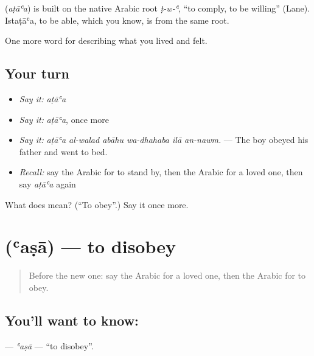 \begin{cousinweb}
\textbf{} (\emph{aṭāʿa}) is built on the native Arabic root \emph{ṭ-w-ʿ}, \textquotedblleft{}to comply, to be willing\textquotedblright{} (Lane). Istaṭāʿa, to be able, which you know, is from the same root.
\end{cousinweb}

\begin{grammarlens}[title={What you've built}]
One more word for describing what you lived and felt.
\end{grammarlens}

\subsection*{Your turn}
\begin{itemize}
\raggedright
  \item \emph{Say it:} \emph{aṭāʿa}
  \item \emph{Say it:} \emph{aṭāʿa}, once more
  \item \emph{Say it:} \emph{aṭāʿa al-walad abāhu wa-dhahaba ilā an-nawm.} — The boy obeyed his father and went to bed.
  \item \emph{Recall:} say the Arabic for to stand by, then the Arabic for a loved one, then say \emph{aṭāʿa} again
\end{itemize}

\begin{tcolorbox}[breakable,colback=teal!4,colframe=teal!35!black,title={Before you move on}]
What does  mean? (\textquotedblleft{}To obey\textquotedblright{}.) Say it once more.
\end{tcolorbox}
\section[\texorpdfstring{\ar{عصى} (ʿaṣā)}{عصى (ʿaṣā)}]{ (ʿaṣā) — to disobey}

\label{lesson:AR-C534-asa}



\begin{quote}
Before the new one: say the Arabic for a loved one, then the Arabic for to obey.
\end{quote}

\subsection*{You'll want to know: }
\textbf{} — \emph{ʿaṣā} — \textquotedblleft{}to disobey\textquotedblright{}.

